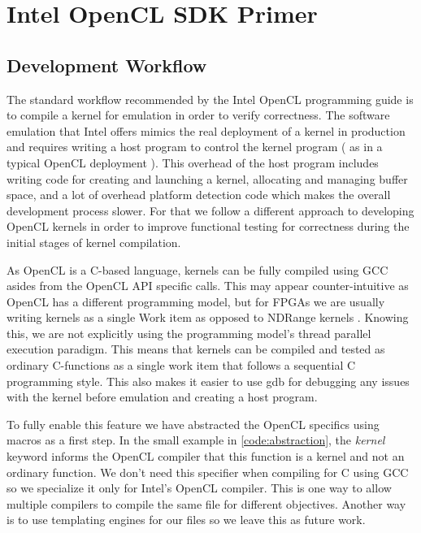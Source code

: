 
\chapter{Intel OpenCL SDK Primer} %

\label{Chapter5} %


\section{Development Workflow} \label{devflow}

The standard workflow recommended by the Intel OpenCL programming guide\cite{progguide} is to compile a kernel for emulation in order to verify correctness. The software emulation that Intel offers mimics the real deployment of a kernel in production and requires writing a host program to control the kernel program ( as in a typical OpenCL deployment ). This overhead of the host program includes writing code for creating and launching a kernel, allocating and managing buffer space, and a lot of overhead platform detection code which makes the overall development process slower. For that we follow a different approach to developing OpenCL kernels in order to improve functional testing for correctness during the initial stages of kernel compilation.

 As OpenCL is a C-based language, kernels can be fully compiled using GCC asides from the OpenCL  API specific calls. This may appear counter-intuitive as OpenCL has a different programming model, but for FPGAs we are usually writing kernels as a single Work item as opposed to NDRange kernels \cite{opencl}. Knowing this, we are not explicitly using the programming model’s thread parallel execution paradigm. This means that kernels can be compiled and tested as ordinary C-functions as a single work item that follows a sequential C programming style. This also makes it easier to use gdb for debugging any issues with the kernel before emulation and creating a host program. 
 
 To fully enable this feature we have abstracted the OpenCL specifics using macros as a first step. In the small example in \ref{code:abstraction}, the \emph{kernel} keyword informs the OpenCL compiler that this function is a kernel and not an ordinary function. We don't need this specifier when compiling for C using GCC so we specialize it only for Intel's OpenCL compiler. This is one way to allow multiple compilers to compile the same file for different objectives. Another way is to use templating engines for our files so we leave this as future work.
 
